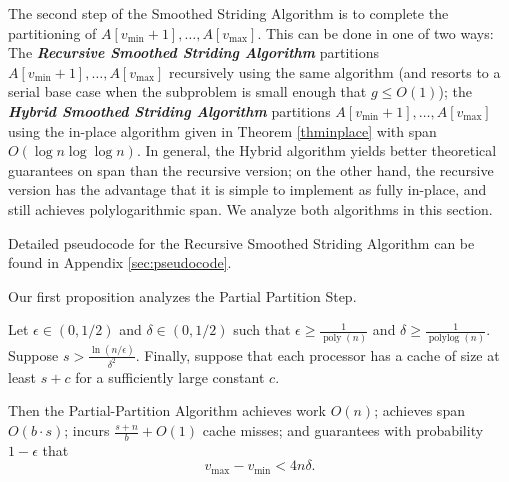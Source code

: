 \documentclass[twoside,leqno,twocolumn]{article}
\newcommand{\poly}{\operatorname{poly}}
\newcommand{\polylog}{\operatorname{polylog}}
\newcommand{\defn}[1]{{\textit{\textbf{\boldmath #1}}}}
\renewcommand{\paragraph}[1]{\vspace{0.09in}\noindent{\bf \boldmath #1.}}
\begin{document}
The second step of the Smoothed Striding Algorithm is to complete the
partitioning of $A[v_{\text{min}} + 1], \ldots, A[v_{\text{max}}]$. This can be done
in one of two ways: The \defn{Recursive Smoothed Striding Algorithm}
partitions $A[v_{\text{min}} + 1], \ldots, A[v_{\text{max}}]$ recursively using the
same algorithm (and resorts to a serial base case when the subproblem
is small enough that $g \le O(1)$); the \defn{Hybrid Smoothed Striding
  Algorithm} partitions $A[v_{\text{min}} + 1], \ldots, A[v_{\text{max}}]$ using the
in-place algorithm given in Theorem \ref{thminplace} with span $O(\log
n \log \log n)$. In general, the Hybrid algorithm yields better
theoretical guarantees on span than the recursive version; on the
other hand, the recursive version has the advantage that it is
simple to implement as fully in-place, and still achieves
polylogarithmic span. We analyze both algorithms in this section.

Detailed pseudocode for the Recursive Smoothed Striding Algorithm can
be found in Appendix \ref{sec:pseudocode}.

\paragraph{Algorithm Analysis} Our first proposition analyzes the Partial Partition Step.
\begin{proposition}
  \label{prop:generalResult}
  
  Let $\epsilon \in (0, 1/2)$ and $\delta \in (0, 1/2)$ such that
  $\epsilon \ge \frac{1}{\poly(n)}$ and $\delta \ge
  \frac{1}{\polylog(n)}$. Suppose $s > \frac{\ln
    (n/\epsilon)}{\delta^2}$. Finally, suppose that each processor has
  a cache of size at least $s + c$ for a sufficiently large constant
  $c$.

  Then the Partial-Partition Algorithm achieves work $O(n)$; achieves
  span $O\left( b \cdot s\right)$; incurs $\frac{s+n}{b} + O(1)$ cache
  misses; and guarantees with probability $1 - \epsilon$ that
  $$v_{\text{max}}-v_{\text{min}} < 4 n \delta.$$
\end{proposition}
\end{document}

